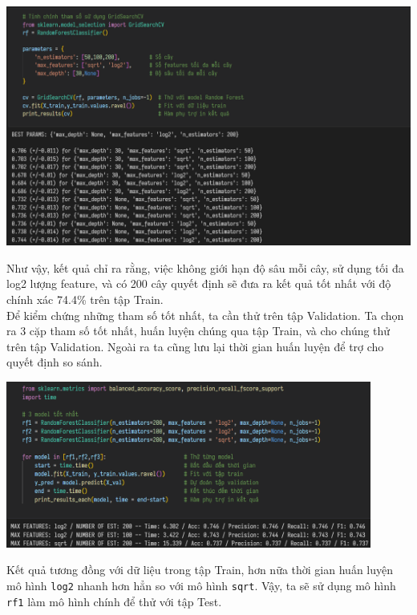 \begin{center}
\includegraphics[width=1\textwidth]{images/code-5.11-gridsearch.png}
\end{center}

Như vậy, kết quả chỉ ra rằng, việc không giới hạn độ sâu mỗi cây, sử dụng tối đa log2 lượng feature, và có 200 cây quyết định sẽ đưa ra kết quả tốt nhất với độ chính xác 74.4\% trên tập Train.\\

Để kiểm chứng những tham số tốt nhất, ta cần thử trên tập Validation. Ta chọn ra 3 cặp tham số tốt nhất, huấn luyện chúng qua tập Train, và cho chúng thử trên tập Validation. Ngoài ra ta cũng lưu lại thời gian huấn luyện để trợ cho quyết định so sánh.

\begin{center}
\includegraphics[width=0.9\textwidth]{images/code-5.12-rfval.png}
\end{center}

Kết quả tương đồng với dữ liệu trong tập Train, hơn nữa thời gian huấn luyện mô hình \texttt{log2} nhanh hơn hẳn so với mô hình \texttt{sqrt}. Vậy, ta sẽ sử dụng mô hình \texttt{rf1} làm mô hình chính để thử với tập Test.\\

